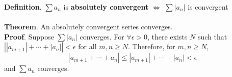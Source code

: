 \documentclass[12pt]{report}
\newcommand{\abs}[1]{\left|#1\right|}
\begin{document}
\textbf{Definition}. $\sum a_n$ is \textbf{absolutely convergent} $\iff$ $\sum \abs{a_n}$ is convergent\\
\\
\textbf{Theorem}. An absolutely convergent series converges.\\
\textbf{Proof}. Suppose $\sum \abs{a_n}$ converges. For $\forall\epsilon>0$, there exists $N$ such that $\abs{\abs{a_{m+1}}+\cdots + \abs{a_n}}<\epsilon$ for all $m, n\geq N$. Therefore, for $m, n\geq N$, $$\abs{a_{m+1}+\cdots + a_n} \leq \abs{a_{m+1}}+\cdots + \abs{a_n} < \epsilon$$
and $\sum a_n$ converges.
\end{document}
